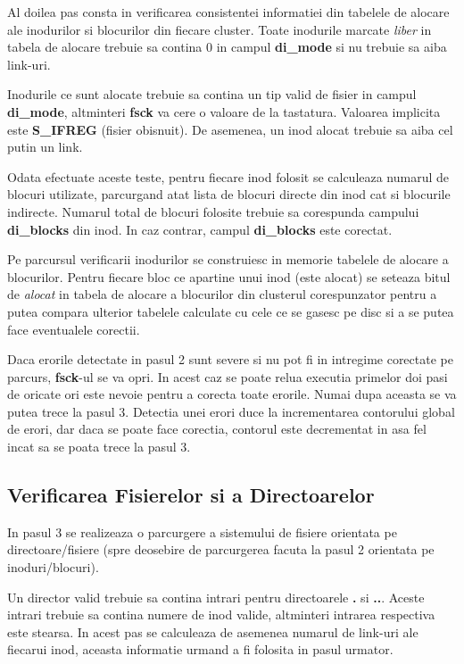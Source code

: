 Al doilea pas consta in verificarea consistentei informatiei din
tabelele de alocare ale inodurilor si blocurilor din fiecare cluster.
Toate inodurile marcate {\em liber} in tabela de alocare trebuie sa
contina 0 in campul {\bf di\_mode} si nu trebuie sa aiba link-uri.

Inodurile ce sunt alocate trebuie sa contina un tip valid de fisier in
campul {\bf di\_mode}, altminteri {\bf fsck} va cere o valoare de la
tastatura.  Valoarea implicita este {\bf S\_IFREG} (fisier obisnuit).
De asemenea, un inod alocat trebuie sa aiba cel putin un link.

Odata efectuate aceste teste, pentru fiecare inod folosit se
calculeaza numarul de blocuri utilizate, parcurgand atat lista de
blocuri directe din inod cat si blocurile indirecte.  Numarul total de
blocuri folosite trebuie sa corespunda campului {\bf di\_blocks} din
inod.  In caz contrar, campul {\bf di\_blocks} este corectat.

Pe parcursul verificarii inodurilor se construiesc in memorie tabelele
de alocare a blocurilor.  Pentru fiecare bloc ce apartine unui inod
(este alocat) se seteaza bitul de {\em alocat} in tabela de alocare a
blocurilor din clusterul corespunzator pentru a putea compara ulterior
tabelele calculate cu cele ce se gasesc pe disc si a se putea face
eventualele corectii.

Daca erorile detectate in pasul 2 sunt severe si nu pot fi in
intregime corectate pe parcurs, {\bf fsck}-ul se va opri.  In acest
caz se poate relua executia primelor doi pasi de oricate ori este
nevoie pentru a corecta toate erorile.  Numai dupa aceasta se va putea
trece la pasul 3.  Detectia unei erori duce la incrementarea
contorului global de erori, dar daca se poate face corectia, contorul
este decrementat in asa fel incat sa se poata trece la pasul 3.


\subsection{Verificarea Fisierelor si a Directoarelor}

In pasul 3 se realizeaza o parcurgere a sistemului de fisiere
orientata pe directoare/fisiere (spre deosebire de parcurgerea facuta
la pasul 2 orientata pe inoduri/blocuri).

Un director valid trebuie sa contina intrari pentru directoarele {\bf
.}  si {\bf ..}.  Aceste intrari trebuie sa contina numere de inod
valide, altminteri intrarea respectiva este stearsa.  In acest pas se
calculeaza de asemenea numarul de link-uri ale fiecarui inod, aceasta
informatie urmand a fi folosita in pasul urmator.


